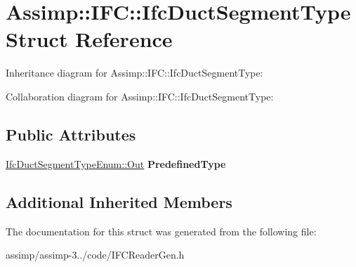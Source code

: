 \hypertarget{struct_assimp_1_1_i_f_c_1_1_ifc_duct_segment_type}{\section{Assimp\+:\+:I\+F\+C\+:\+:Ifc\+Duct\+Segment\+Type Struct Reference}
\label{struct_assimp_1_1_i_f_c_1_1_ifc_duct_segment_type}
}


Inheritance diagram for Assimp\+:\+:I\+F\+C\+:\+:Ifc\+Duct\+Segment\+Type\+:


Collaboration diagram for Assimp\+:\+:I\+F\+C\+:\+:Ifc\+Duct\+Segment\+Type\+:
\subsection*{Public Attributes}
\begin{DoxyCompactItemize}
\item 
\hypertarget{struct_assimp_1_1_i_f_c_1_1_ifc_duct_segment_type_a94bb3c12aa04c8edb2bfeaa62087ea0a}{\hyperlink{classboost_1_1shared__ptr}{Ifc\+Duct\+Segment\+Type\+Enum\+::\+Out} {\bfseries Predefined\+Type}}\label{struct_assimp_1_1_i_f_c_1_1_ifc_duct_segment_type_a94bb3c12aa04c8edb2bfeaa62087ea0a}

\end{DoxyCompactItemize}
\subsection*{Additional Inherited Members}


The documentation for this struct was generated from the following file\+:\begin{DoxyCompactItemize}
\item 
assimp/assimp-\/3../code/I\+F\+C\+Reader\+Gen.\+h\end{DoxyCompactItemize}
